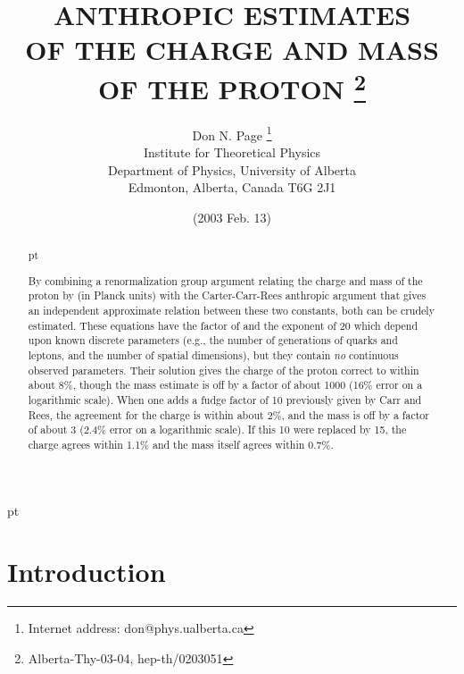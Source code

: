 \documentclass[a4paper,12pt]{article}
\begin{document}
\title{{\bf ANTHROPIC ESTIMATES
\\ OF THE CHARGE AND MASS OF THE PROTON}
\thanks{Alberta-Thy-03-04, hep-th/0203051}}
\author{
Don N. Page
\thanks{Internet address:
don@phys.ualberta.ca}
\\
Institute for Theoretical Physics\\
Department of Physics, University of Alberta\\
Edmonton, Alberta, Canada T6G 2J1
}
\date{(2003 Feb. 13)}
\maketitle
\large

\begin{abstract}
 pt

	By combining a renormalization group argument
relating the charge \coordHE{} and mass \coordHE{} of the proton
by \coordHE{} (in Planck units)
with the Carter-Carr-Rees anthropic argument that gives
an independent approximate relation \coordHE{}
between these two constants, both can be crudely estimated.
These equations have the factor of \myHighlight{$0.1\pi$}\coordHE{} and the exponent of 20
which depend upon known discrete parameters
(e.g., the number of generations of quarks and leptons,
and the number of spatial dimensions),
but they contain {\it no} continuous observed parameters.
Their solution gives the charge of the proton correct to within about 8\%,
though the mass estimate is off by a factor of about 1000
(16\% error on a logarithmic scale).
When one adds a fudge factor of 10 previously given by Carr and Rees,
the agreement for the charge is within about 2\%,
and the mass is off by a factor of about 3
(2.4\% error on a logarithmic scale).
If this 10 were replaced by 15, the charge agrees
within 1.1\% and the mass itself agrees within 0.7\%.


\end{abstract}
\normalsize
{} pt
\newpage

\section{Introduction}
\end{document}
